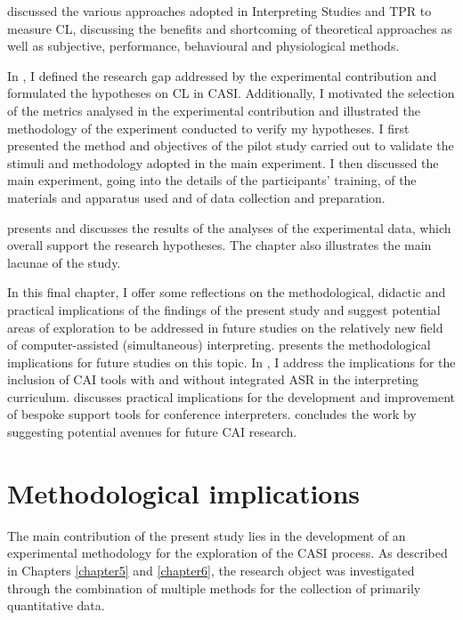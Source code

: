  discussed the various approaches adopted in Interpreting Studies and TPR to measure CL, discussing the benefits and shortcoming of theoretical approaches as well as subjective, performance, behavioural and physiological methods.

In , I defined the research gap addressed by the experimental contribution and formulated the hypotheses on CL in CASI. Additionally, I motivated the selection of the metrics analysed in the experimental contribution and illustrated the methodology of the experiment conducted to verify my hypotheses. I first presented the method and objectives of the pilot study carried out to validate the stimuli and methodology adopted in the main experiment. I then discussed the main experiment, going into the details of the participants' training, of the materials and apparatus used and of data collection and preparation.

 presents and discusses the results of the analyses of the experimental data, which overall support the research hypotheses. The chapter also illustrates the main lacunae of the study.

In this final chapter, I offer some reflections on the methodological, didactic and practical implications of the findings of the present study and suggest potential areas of exploration to be addressed in future studies on the relatively new field of computer-assisted (simultaneous) interpreting.  presents the methodological implications for future studies on this topic. In , I address the implications for the inclusion of CAI tools with and without integrated ASR in the interpreting curriculum.  discusses practical implications for the development and improvement of bespoke support tools for conference interpreters.  concludes the work by suggesting potential avenues for future CAI research.

\section{Methodological implications} \label{implications_method}
The main contribution of the present study lies in the development of an experimental methodology for the exploration of the CASI process. As described in Chapters \ref{chapter5} and \ref{chapter6}, the research object was investigated through the combination of multiple methods for the collection of primarily quantitative data.

